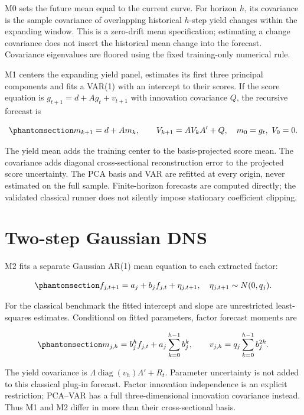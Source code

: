 \documentclass[
  12pt,
  letterpaper,
  DIV=11,
  numbers=noendperiod]{scrreprt}
\begin{document}
M0 sets the future mean equal to the current curve. For horizon \(h\),
its covariance is the sample covariance of overlapping historical
\(h\)-step yield changes within the expanding window. This is a
zero-drift mean specification; estimating a change covariance does not
insert the historical mean change into the forecast. Covariance
eigenvalues are floored using the fixed training-only numerical rule.

M1 centers the expanding yield panel, estimates its first three
principal components and fits a VAR(1) with an intercept to their
scores. If the score equation is \(g_{t+1}=d+Ag_t+v_{t+1}\) with
innovation covariance \(Q\), the recursive forecast is

\begin{equation}\protect\phantomsection\label{eq-var-forecast}{
m_{k+1}=d+Am_k,\qquad V_{k+1}=AV_kA'+Q,
\quad m_0=g_t,\ V_0=0.
}\end{equation}

The yield mean adds the training center to the basis-projected score
mean. The covariance adds diagonal cross-sectional reconstruction error
to the projected score uncertainty. The PCA basis and VAR are refitted
at every origin, never estimated on the full sample. Finite-horizon
forecasts are computed directly; the validated classical runner does not
silently impose stationary coefficient clipping.

\section{Two-step Gaussian DNS}\label{two-step-gaussian-dns}

M2 fits a separate Gaussian AR(1) mean equation to each extracted
factor:

\begin{equation}\protect\phantomsection\label{eq-ar}{
f_{j,t+1}=a_j+b_j f_{j,t}+\eta_{j,t+1},
\quad \eta_{j,t+1}\sim N(0,q_j).
}\end{equation}

For the classical benchmark the fitted intercept and slope are
unrestricted least-squares estimates. Conditional on fitted parameters,
factor forecast moments are

\begin{equation}\protect\phantomsection\label{eq-ar-moments}{
 m_{j,h}=b_j^h f_{j,t}+a_j\sum_{k=0}^{h-1}b_j^k,
\qquad v_{j,h}=q_j\sum_{k=0}^{h-1}b_j^{2k}.
}\end{equation}

The yield covariance is \(\Lambda\operatorname{diag}(v_h)\Lambda'+R_t\).
Parameter uncertainty is not added to this classical plug-in forecast.
Factor innovation independence is an explicit restriction; PCA--VAR has
a full three-dimensional innovation covariance instead. Thus M1 and M2
differ in more than their cross-sectional basis.
\end{document}
